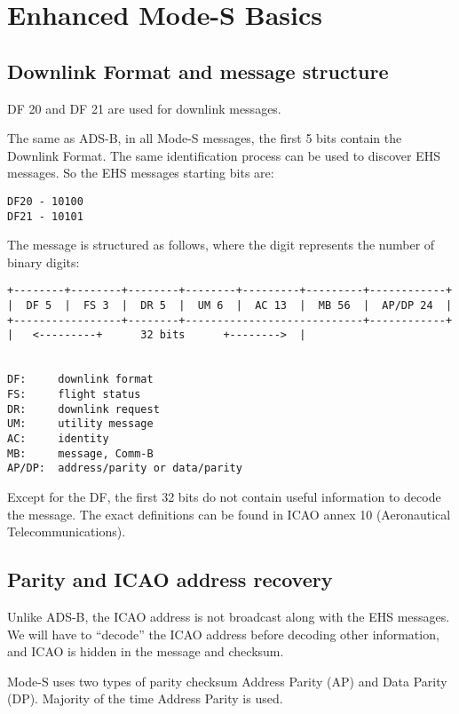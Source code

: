 \section{Enhanced Mode-S Basics}\label{introduction}

\subsection{Downlink Format and message
structure}\label{downlink-format-and-message-structure}

DF 20 and DF 21 are used for downlink messages.

The same as ADS-B, in all Mode-S messages, the first 5 bits contain the
Downlink Format. The same identification process can be used to discover
EHS messages. So the EHS messages starting bits are:

\begin{verbatim}
DF20 - 10100
DF21 - 10101
\end{verbatim}

The message is structured as follows, where the digit represents the
number of binary digits:

\begin{verbatim}
+--------+--------+--------+--------+---------+---------+------------+
|  DF 5  |  FS 3  |  DR 5  |  UM 6  |  AC 13  |  MB 56  |  AP/DP 24  |
+-----------------+--------+----------------------------+------------+
|   <---------+      32 bits      +-------->  |


DF:     downlink format
FS:     flight status
DR:     downlink request
UM:     utility message
AC:     identity
MB:     message, Comm-B
AP/DP:  address/parity or data/parity
\end{verbatim}

Except for the DF, the first 32 bits do not contain useful information
to decode the message. The exact definitions can be found in ICAO annex
10 (Aeronautical Telecommunications).

\subsection{Parity and ICAO address
recovery}\label{parity-and-icao-address-recovery}

Unlike ADS-B, the ICAO address is not broadcast along with the EHS
messages. We will have to ``decode'' the ICAO address before decoding
other information, and ICAO is hidden in the message and checksum.

Mode-S uses two types of parity checksum Address Parity (AP) and Data
Parity (DP). Majority of the time Address Parity is used.

